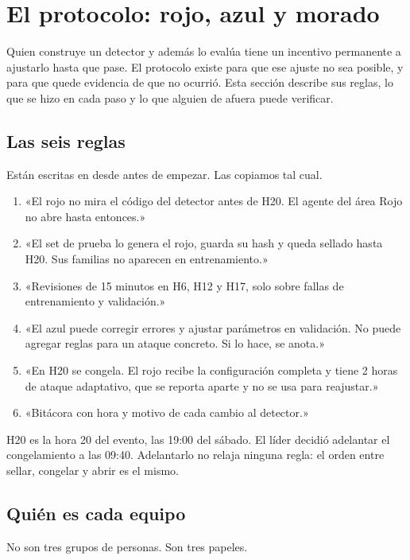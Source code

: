\section{El protocolo: rojo, azul y morado}\label{sec:protocolo}

Quien construye un detector y además lo evalúa tiene un incentivo permanente a ajustarlo hasta que
pase. El protocolo existe para que ese ajuste no sea posible, y para que quede evidencia de que no
ocurrió. Esta sección describe sus reglas, lo que se hizo en cada paso y lo que alguien de afuera
puede verificar.

\subsection{Las seis reglas}

Están escritas en  desde antes de empezar. Las copiamos tal cual.

\begin{enumerate}
  \item «El rojo no mira el código del detector antes de H20. El agente del área Rojo no abre
     hasta entonces.»
  \item «El set de prueba lo genera el rojo, guarda su hash y queda sellado hasta H20. Sus familias no
    aparecen en entrenamiento.»
  \item «Revisiones de 15 minutos en H6, H12 y H17, solo sobre fallas de entrenamiento y validación.»
  \item «El azul puede corregir errores y ajustar parámetros en validación. No puede agregar reglas
    para un ataque concreto. Si lo hace, se anota.»
  \item «En H20 se congela. El rojo recibe la configuración completa y tiene 2 horas de ataque
    adaptativo, que se reporta aparte y no se usa para reajustar.»
  \item «Bitácora con hora y motivo de cada cambio al detector.»
\end{enumerate}

H20 es la hora 20 del evento, las 19:00 del sábado. El líder decidió adelantar el congelamiento a
las 09:40. Adelantarlo no relaja ninguna regla: el orden entre sellar, congelar y abrir es el mismo.

\subsection{Quién es cada equipo}

No son tres grupos de personas. Son tres papeles.

